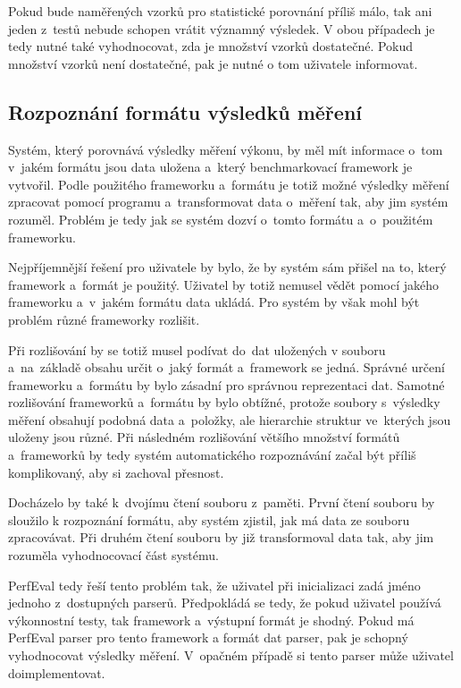 Pokud bude naměřených vzorků pro statistické porovnání příliš málo, tak ani jeden z~testů nebude schopen
vrátit významný výsledek. V obou případech je tedy nutné také vyhodnocovat, zda je množství vzorků dostatečné.
Pokud množství vzorků není dostatečné, pak je nutné o tom uživatele informovat.

\subsection{Rozpoznání formátu výsledků měření}

Systém, který porovnává výsledky měření výkonu, by měl mít informace o~tom v~jakém formátu jsou data uložena
a~který benchmarkovací framework je vytvořil. Podle použitého frameworku a~formátu je totiž možné výsledky
měření zpracovat pomocí programu a~transformovat data o~měření tak, aby jim systém rozuměl.
Problém je tedy jak se systém dozví o~tomto formátu a~o~použitém frameworku.

Nejpříjemnější řešení pro uživatele by bylo, že by systém sám přišel na to, který framework a~formát je použitý.
Uživatel by totiž nemusel vědět pomocí jakého frameworku a~v~jakém formátu data ukládá. Pro systém by však mohl
být problém různé frameworky rozlišit.

Při rozlišování by se totiž musel podívat do~dat uložených v souboru
a~na~základě obsahu určit o~jaký formát a~framework se jedná. Správné určení frameworku a~formátu by bylo zásadní pro
správnou reprezentaci dat. Samotné rozlišování frameworků a~formátu by bylo obtížné, protože soubory s~výsledky
měření obsahují podobná data a~položky, ale hierarchie struktur ve~kterých jsou uloženy jsou různé.
Při následném rozlišování většího množství formátů a~frameworků by tedy systém automatického rozpoznávání
začal být příliš komplikovaný, aby si zachoval přesnost.

Docházelo by také k~dvojímu čtení souboru z~paměti. První čtení souboru by sloužilo k rozpoznání formátu,
aby systém zjistil, jak má data ze souboru zpracovávat. Při druhém čtení souboru by již transformoval data
tak, aby jim rozuměla vyhodnocovací část systému.

PerfEval tedy řeší tento problém tak, že uživatel při inicializaci zadá jméno jednoho z~dostupných parserů.
Předpokládá se tedy, že pokud uživatel používá výkonnostní testy, tak framework a~výstupní formát je shodný.
Pokud má PerfEval parser pro tento framework a formát dat parser, pak je schopný vyhodnocovat výsledky měření.
V~opačném případě si tento parser může uživatel doimplementovat.

